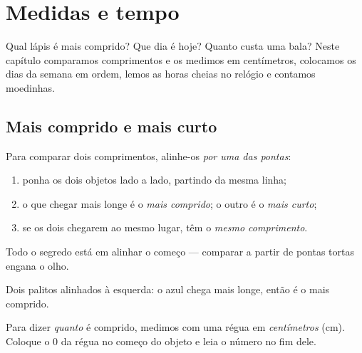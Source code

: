 \chapter{Medidas e tempo}\label{ch:g1:measure}

Qual lápis é mais comprido? Que dia é hoje? Quanto custa uma bala?
Neste capítulo comparamos comprimentos e os medimos em centímetros,
colocamos os dias da semana em ordem, lemos as horas cheias no
relógio e contamos moedinhas.

\section{Mais comprido e mais curto}

\begin{method}\label{met:g1:measure:compare}
Para comparar dois comprimentos, alinhe-os \emph{por uma das
pontas}:
\begin{enumerate}
  \item ponha os dois objetos lado a lado, partindo da mesma linha;
  \item o que chegar mais longe é o \emph{mais comprido}; o outro é o
        \emph{mais curto};
  \item se os dois chegarem ao mesmo lugar, têm o \emph{mesmo
        comprimento}.
\end{enumerate}
Todo o segredo está em alinhar o começo --- comparar a partir de
pontas tortas engana o olho.
\end{method}

\begin{omfigure}

{\small Dois palitos alinhados à esquerda: o azul chega mais longe,
então é o mais comprido.}
\end{omfigure}

\begin{definition}[O centímetro]\label{def:g1:measure:cm}
Para dizer \emph{quanto} é comprido, medimos com uma régua em
\emph{centímetros} (cm). Coloque o $0$ da régua no começo do objeto
e leia o número no fim dele.
\end{definition}

